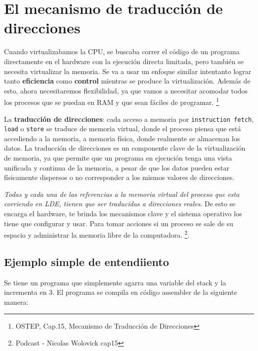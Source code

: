 \documentclass{article}
\begin{document}
\section{El mecanismo de traducción de direcciones}
Cuando virtualizabamos la CPU, se buscaba correr el código de un programa directamente en el hardware con la ejecución directa limitada, pero también se necesita virtualizar la memoria. Se va a usar un enfoque similar intentanto lograr tanto \textbf{eficiencia} como \textbf{control} mientras se produce la virtualización. Además de esto, ahora necesitaremos flexibilidad, ya que vamos a necesitar acomodar todos los procesos que se puedan en RAM y que sean fáciles de programar. 
\footnote{OSTEP, Cap.15, Mecanismo de Traducción de Direcciones}
\begin{definition}
    La \textbf{traducción de direcciones}: cada acceso a memoria por \texttt{instruction fetch}, \texttt{load} o \texttt{store} se traduce de memoria virtual, donde el proceso piensa que está accediendo a la memoria, a memoria física, donde realmente se almacenan los datos. La traducción de direcciones es un componente clave de la virtualización de memoria, ya que permite que un programa en ejecución tenga una vista unificada y continua de la memoria, a pesar de que los datos pueden estar físicamente dispersos o no corresponder a los mismos valores de direcciones.
\end{definition}

\textit{Todas y cada una de las referencias a la memoria virtual del proceso que esta corriendo en LDE, tienen que ser traducidas a direcciones reales}. De esto se encarga el hardware, te brinda los mecanismos clave y el sistema operativo los tiene que configurar y usar. Para tomar acciones si un proceso se sale de su espacio y administrar la memoria libre de la computadora. \footnote{Podcast - Nicolas Wolovick cap15}.

\subsection{Ejemplo simple de entendiiento}
Se tiene un programa que simplemente agarra una variable del stack y la incrementa en 3. El programa se compila en código assembler de la siguiente manera:
\end{document}
